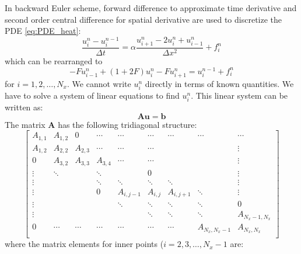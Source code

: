 \documentclass[a4paper,11pt]{article}
\begin{document}
In backward Euler scheme, forward difference to approximate time derivative and second order
central difference for spatial derivative are used to discretize the PDE \eqref{eq:PDE_heat}:
\begin{equation}
\frac{u_{i}^{n} - u_{i}^{n-1}}{\Delta t} = \alpha
\frac{u^{n}_{i+1} - 2u^{n}_{i} + u^{n}_{i-1}}{\Delta x^2} + f_{i}^{n}
\end{equation}
%
which can be rearranged to
%
\begin{equation}
-Fu_{i-1}^{n} + (1 + 2F)u_{i}^{n} - F u_{i+1}^{n} = u^{n-1}_{i} + f^{n}_{i}
\end{equation}
for $i = 1, 2, \ldots, N_{x}$.
We cannot write $u^{n}_{i}$ directly in terms of known quantities. We have
to solve a system of linear equations to find $u^{n}_{i}$. This linear system
can be written as:
\begin{equation}
\mathbf{A}\mathbf{u} = \mathbf{b}
\end{equation}
%
The matrix $\mathbf{A}$ has the following tridiagonal structure:
%
\begin{equation}
\begin{bmatrix}
A_{1,1} & A_{1,2} & 0       & \cdots  & \cdots    & \cdots  & \cdots    & \cdots        & \cdots \\
A_{1,2} & A_{2,2} & A_{2,3} & \cdots  & \cdots    & \cdots  &           &               & \vdots \\
0       & A_{3,2} & A_{3,3} & A_{3,4} & \cdots    & \cdots  &           &               & \vdots \\
\vdots  & \ddots  &         & \ddots  &           &  0      &           &               & \vdots \\
\vdots  &         &         & \ddots  & \ddots    & \ddots  & \ddots    &               & \vdots \\
\vdots  &         &         & 0       & A_{i,j-1} & A_{i,j} & A_{i,j+1} & \ddots        & \vdots \\
\vdots  &         &         &         & \ddots    & \ddots  & \ddots    & \ddots        & 0 \\
\vdots  &         &         &         &           & \ddots  & \ddots    & \ddots        & A_{N_x-1,N_x} \\
0       & \cdots  & \cdots  & \cdots  & \cdots    & \cdots  & \cdots    & A_{N_x,N_x-1} & A_{N_x,N_x} \\
\end{bmatrix}
\end{equation}
where the matrix elements for inner points ($i = 2,3,\ldots,N_{x}-1$ are:
\end{document}
